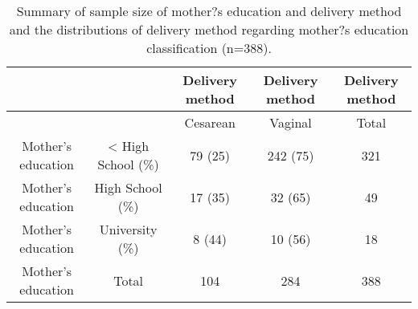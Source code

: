 \begin{table}[htp]
\tiny
\caption[Comparisons of gestational weight gain of the Daxin cohort with the 2009 Institute of Medicine (IOM) guidelines]{Summary of sample size of mother?s education and delivery method and the distributions of delivery method regarding mother?s education classification (n=388).}
\begin{center}
\begin{tabular}{|c|c|c|c|c|}
\hline
 &  & Delivery method & Delivery method & Delivery method  \\ \hline
 &  & Cesarean & Vaginal & Total  \\ \hline
Mother's education & < High School (\%) & 79 (25) & 242 (75) & 321  \\ \hline
Mother's education & High School (\%) & 17 (35) & 32 (65) & 49  \\ \hline
Mother's education & University (\%) & 8 (44) & 10 (56) & 18  \\ \hline
Mother's education & Total & 104 & 284 & 388  \\ \hline
\end{tabular}
\end{center}
\label{default}
\end{table}